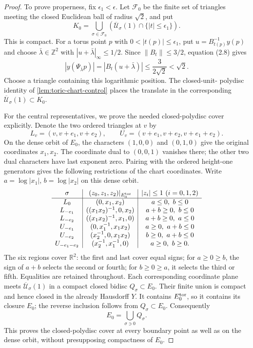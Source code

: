 \begin{proof}
To prove properness, fix \(\epsilon_1<\epsilon\).  Let \(\mathcal F_0\) be
the finite set of triangles meeting the closed Euclidean ball of radius
\(\sqrt2\), and put
\[
 K_0=\bigcup_{\sigma\in\mathcal F_0}
 \left(\overline{\mathcal U}_\sigma(1)
 \cap\{|t|\le\epsilon_1\}\right).
\]
This is compact.  For a torus point \(p\) with
\(0<|t(p)|\le\epsilon_1\), put \(u=B_{t(p)}^{-1}y(p)\) and choose
\(\bar\lambda\in\mathbb Z^2\) with
\(|u+\bar\lambda|_\infty\le1/2\).  Since
\(\|B_t\|\le3/2\), equation (2.8) gives
\[
 |y(\Psi_{\bar\lambda}p)|
 =|B_t(u+\bar\lambda)|
 \le\frac{3}{2\sqrt2}<\sqrt2.
\]
Choose a triangle containing this logarithmic position.  The closed-unit-
polydisc identity of \cref{lem:toric-chart-control} places the translate
in the corresponding
\(\overline{\mathcal U}_\sigma(1)\subset K_0\).

For the central representatives, we prove the needed closed-polydisc
cover explicitly.  Denote the two ordered triangles at \(v\) by
\[
 L_v=(v,v+e_1,v+e_2),\qquad
 U_v=(v+e_1,v+e_2,v+e_1+e_2).
\]
On the dense orbit of \(E_0\), the characters \((1,0,0)\) and
\((0,1,0)\) give the original coordinates \(x_1,x_2\).  The coordinate
dual to \((0,0,1)\) vanishes there; the other two dual characters have
last exponent zero.  Pairing with the ordered height-one generators gives
the following restrictions of the chart coordinates.  Write
\(a=\log|x_1|\), \(b=\log|x_2|\) on this dense orbit.
\[
\begin{array}{c|c|c}
 \sigma&(z_0,z_1,z_2)|_{E_0^{\rm tor}}&|z_i|\le1\ (i=0,1,2)\\\hline
 L_0&(0,x_1,x_2)&a\le0,\ b\le0\\
 L_{-e_1}&((x_1x_2)^{-1},0,x_2)&a+b\ge0,\ b\le0\\
 L_{-e_2}&((x_1x_2)^{-1},x_1,0)&a+b\ge0,\ a\le0\\
 U_{-e_1}&(0,x_1^{-1},x_1x_2)&a\ge0,\ a+b\le0\\
 U_{-e_2}&(x_2^{-1},0,x_1x_2)&b\ge0,\ a+b\le0\\
 U_{-e_1-e_2}&(x_2^{-1},x_1^{-1},0)&a\ge0,\ b\ge0.
\end{array}
\]
The six regions cover \(\mathbb R^2\): the first and last cover equal
signs; for \(a\ge0\ge b\), the sign of \(a+b\) selects the second or
fourth; for \(b\ge0\ge a\), it selects the third or fifth.  Equalities
are retained throughout.  Each corresponding coordinate plane meets
\(\overline{\mathcal U}_\sigma(1)\) in a compact closed bidisc
\(Q_\sigma\subset E_0\).  Their finite union is compact and hence closed
in the already Hausdorff \(Y\).  It contains \(E_0^{\rm tor}\), so it
contains its closure \(E_0\); the reverse inclusion follows from
\(Q_\sigma\subset E_0\).  Consequently
\[
 E_0=\bigcup_{\sigma\ni0}Q_\sigma.
\]
This proves the closed-polydisc cover at every boundary point as well as
on the dense orbit, without presupposing compactness of \(E_0\).


\end{proof}
